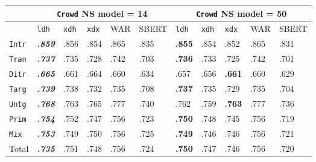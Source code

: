 \documentclass[handout,xcolor={dvipsnames}]{beamer}
\newcommand{\feat}[1]{\textsc{#1}}
\newcommand{\param}[1]{\texttt{#1}}
\begin{document}
\begin{frame}
\begin{table}[htb!]
\begin{center}
\setlength{\tabcolsep}{.35em}
\begin{tabular}{|l||l|l|l||l|l||l|l|l||l|l|}
\hline
 & \multicolumn{5}{c||}{\param{Crowd} NS model = 14} & \multicolumn{5}{c|}{\param{Crowd} NS model = 50} \\
\hline
    		& \param{ldh}	& \param{xdh} &	\param{xdx} & WAR	& {\scriptsize SBERT} & \param{ldh}	& \param{xdh} &	\param{xdx} & WAR	& {\scriptsize SBERT} \\ \hline
\hline
\param{Intr}   & \textbf{\textit{.859}} & .856 & .854 & .865 & .835  & \textbf{.855} & .854 & .852 & .865 & .831 \\ \hline
\param{Tran}    & \textit{\textbf{.737}} & .735 & .728 & .742 & .703   & \textbf{.736} & .733 & .725 & .742 & .701 \\ \hline
\param{Ditr}    & \textit{\textbf{.665}} & .661 & .664 & .660 & .634  & .657 & .656 & \textbf{.661} & .660 & .629 \\ \hline
\hline
\param{Targ}    & \textit{\textbf{.739}} & .738 & .732 & .735 & .708  & \textbf{.737} & .735 & .729 & .735 & .704 \\ \hline
\param{Untg}    & \textit{\textbf{.768}} & .763 & .765 & .777 & .740  & .762 & .759 & \textbf{.763} & .777 & .736 \\ \hline
\hline
\param{Prim}    & \textit{\textbf{.754}} & .752 & .747 & .756 & .723  & \textbf{.750} & .748 & .745 & .756 & .719 \\ \hline
\param{Mix}      & \textit{\textbf{.753}} & .749 & .750 & .756 & .725  & \textbf{.749} & .746 & .746 & .756 & .721 \\ \hline
\hline
Total 	 & \textit{\textbf{.735}} & .751 & .748 & .756 & .724 	& \textbf{.750} & .747 & .746 & .756 & .720 \\ \hline
\end{tabular}
\end{center}
\end{table}


\end{frame}
\end{document}
